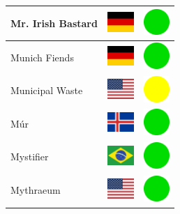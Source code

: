 \documentclass[12pt, a4paper, twoside]{report}
\begin{document}
\begin{center}
\begin{longtable}{|p{5cm}|p{2cm}|p{2cm}|}
 Mr. Irish Bastard                                          & \includegraphics[width=1cm]{../4x3/de} &   \includegraphics[width=1cm]{../likes/y} \\ \hline
 Munich Fiends                                              & \includegraphics[width=1cm]{../4x3/de} &   \includegraphics[width=1cm]{../likes/y} \\ \hline
 Municipal Waste                                            & \includegraphics[width=1cm]{../4x3/us} &   \includegraphics[width=1cm]{../likes/m} \\ \hline
 Múr                                                        & \includegraphics[width=1cm]{../4x3/is} &   \includegraphics[width=1cm]{../likes/y} \\ \hline
 Mystifier                                                  & \includegraphics[width=1cm]{../4x3/br} &   \includegraphics[width=1cm]{../likes/y} \\ \hline
 Mythraeum                                                  & \includegraphics[width=1cm]{../4x3/us} &   \includegraphics[width=1cm]{../likes/y} \\ \hline

\end{longtable}
\end{center}
\end{document}

